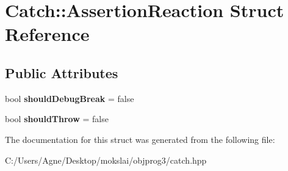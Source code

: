 \hypertarget{struct_catch_1_1_assertion_reaction}{}\section{Catch\+:\+:Assertion\+Reaction Struct Reference}
\label{struct_catch_1_1_assertion_reaction}
\subsection*{Public Attributes}
\begin{DoxyCompactItemize}
\item 
\mbox{\label{struct_catch_1_1_assertion_reaction_adcf30fb90ff20d9789df78d424652497}} 
bool {\bfseries should\+Debug\+Break} = false
\item 
\mbox{\label{struct_catch_1_1_assertion_reaction_a82c8d95a2c1b6a331bde66982a8e090f}} 
bool {\bfseries should\+Throw} = false
\end{DoxyCompactItemize}


The documentation for this struct was generated from the following file\+:\begin{DoxyCompactItemize}
\item 
C\+:/\+Users/\+Agne/\+Desktop/mokslai/objprog3/catch.\+hpp\end{DoxyCompactItemize}
